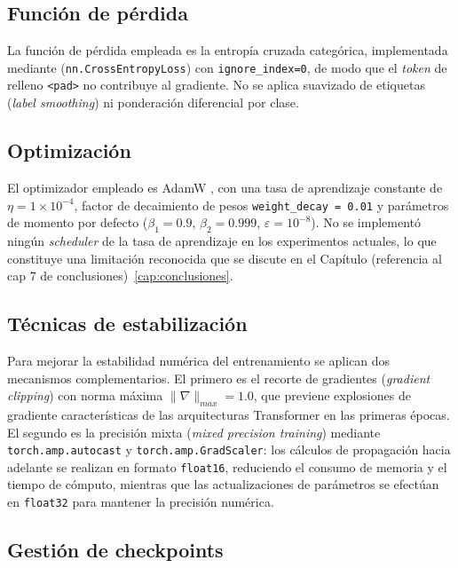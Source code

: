 \subsection{Función de pérdida}

La función de pérdida empleada es la entropía cruzada categórica,
implementada mediante (\texttt{nn.CrossEntropyLoss}) con \texttt{ignore\_index=0}, de modo
que el \textit{token} de relleno \texttt{<pad>} no contribuye al
gradiente. No se aplica suavizado de etiquetas (\textit{label smoothing})
ni ponderación diferencial por clase.

\subsection{Optimización}

El optimizador empleado es AdamW \cite{vaswani2017attention}, con una
tasa de aprendizaje constante de $\eta = 1 \times 10^{-4}$, factor de
decaimiento de pesos \texttt{weight\_decay = 0.01} y parámetros de
momento por defecto ($\beta_1 = 0.9$, $\beta_2 = 0.999$,
$\varepsilon = 10^{-8}$). No se implementó ningún \textit{scheduler} de
la tasa de aprendizaje en los experimentos actuales, lo que constituye
una limitación reconocida que se discute en el
Capítulo (referencia al cap 7 de conclusiones)~\ref{cap:conclusiones}.

\subsection{Técnicas de estabilización}

Para mejorar la estabilidad numérica del entrenamiento se aplican
dos mecanismos complementarios. El primero es el recorte de gradientes
(\textit{gradient clipping}) con norma máxima $\|\nabla\|_{max} = 1.0$,
que previene explosiones de gradiente características de las arquitecturas
Transformer en las primeras épocas. El segundo es la precisión mixta
(\textit{mixed precision training}) mediante \texttt{torch.amp.autocast}
y \texttt{torch.amp.GradScaler}: los cálculos de propagación hacia
adelante se realizan en formato \texttt{float16}, reduciendo el consumo
de memoria y el tiempo de cómputo, mientras que las actualizaciones de
parámetros se efectúan en \texttt{float32} para mantener la precisión
numérica.

\subsection{Gestión de checkpoints}

